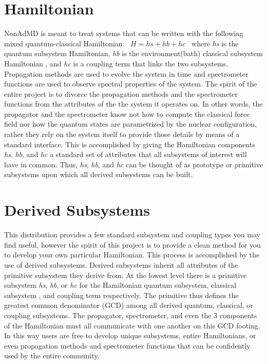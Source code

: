 \hypertarget{_overview_Hamiltonian}{}\section{Hamiltonian}\label{_overview_Hamiltonian}
Non\+Ad\+M\+D is meant to treat systems that can be written with the following mixed quantum-\/classical Hamiltonian\+:~\newline
 $H=hs+hb+hc$~\newline
where {\itshape hs} is the quantum subsystem Hamiltonian, {\itshape hb} is the environment(bath) classical subsystem Hamiltonian , and {\itshape hc} is a coupling term that links the two subsystems. Propagation methods are used to evolve the system in time and spectrometer functions are used to observe spectral properties of the system. The spirit of the entire project is to divorce the propagation methods and the spectrometer functions from the attributes of the the system it operates on. In other words, the propagator and the spectrometer know not how to compute the classical force field nor how the quantum states are parametrized by the nuclear configuration, rather they rely on the system itself to provide those details by means of a standard interface. This is accomplished by giving the Hamiltonian components {\itshape hs}, {\itshape hb}, and {\itshape hc} a standard set of attributes that all subsystems of interest will have in common. Thus, {\itshape hs}, {\itshape hb}, and {\itshape hc} can be thought of as prototype or primitive subsystems upon which all derived subsystems can be built.\hypertarget{_overview_Derived_Subsystems}{}\section{Derived Subsystems}\label{_overview_Derived_Subsystems}
This distribution provides a few standard subsystem and coupling types you may find useful, however the spirit of this project is to provide a clean method for you to develop your own particular Hamiltonian. This process is accomplished by the use of derived subsystems. Derived subsystems inherit all attributes of the primitive subsystem they derive from. At the lowest level there is a primitive subsystem {\itshape hs}, {\itshape hb}, or {\itshape hc} for the Hamiltonian quantum subsystem, classical subsystem , and coupling term respectively. The primitive thus defines the greatest common denominator (G\+C\+D) among all derived quantum, classical, or coupling subsystems. The propagator, spectrometer, and even the 3 components of the Hamiltonian must all communicate with one another on this G\+C\+D footing. In this way users are free to develop unique subsystems, entire Hamiltonians, or even propagation methods and spectrometer functions that can be confidently used by the entire community.

